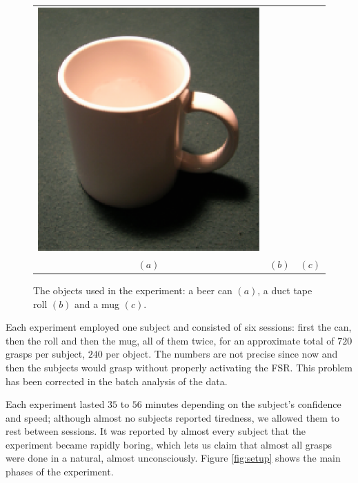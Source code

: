\begin{figure}[htbp]
\begin{center}
\begin{tabular}{ccc}
      \includegraphics[height=0.2\textheight]{mug.eps} \\
      $(a)$ & $(b)$ & $(c)$
    \end{tabular}
    \caption{The objects used in the experiment: a beer can $(a)$, a
    duct tape roll $(b)$ and a mug $(c)$.}
    \label{fig:objects}
  \end{center}
\end{figure}

Each experiment employed one subject and consisted of six sessions:
first the can, then the roll and then the mug, all of them twice,
for an approximate total of $720$ grasps per subject, $240$ per
object. The numbers are not precise since now and then the subjects
would grasp without properly activating the FSR. This problem has been
corrected in the batch analysis of the data.

Each experiment lasted $35$ to $56$ minutes depending on the subject's
confidence and speed; although almost no subjects reported tiredness,
we allowed them to rest between sessions. It was reported by almost
every subject that the experiment became rapidly boring, which lets us
claim that almost all grasps were done in a natural, almost
unconsciously. Figure \ref{fig:setup} shows the main phases of the
experiment.

